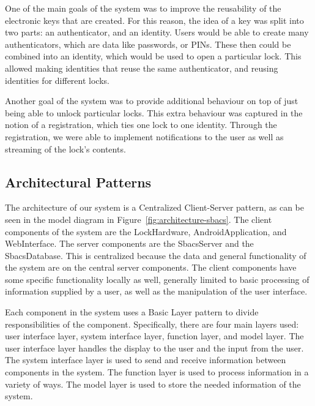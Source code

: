 \documentclass[12pt]{report}
\let\Oldsubsection\subsection
\renewcommand{\subsection}{\FloatBarrier\Oldsubsection}
\begin{document}
One of the main goals of the system was to improve the reusability of the electronic keys that are created. For this
reason, the idea of a key was split into two parts: an authenticator, and an identity. Users would be able to create
many authenticators, which are data like passwords, or PINs. These then could be combined into an identity, which
would be used to open a particular lock. This allowed making identities that reuse the same authenticator, and reusing
identities for different locks.

Another goal of the system was to provide additional behaviour on top of just being able to unlock particular locks.
This extra behaviour was captured in the notion of a registration, which ties one lock to one identity. Through the
registration, we were able to implement notifications to the user as well as streaming of the lock's contents.


\subsection{Architectural Patterns} \label{architectural-patterns}


The architecture of our system is a Centralized Client-Server pattern, as can be seen in the model diagram 
in Figure~\ref{fig:architecture-sbacs}. The client components of
the system are the LockHardware, AndroidApplication, and WebInterface. The server components are the SbacsServer and
the SbacsDatabase. This is centralized because the data and general functionality of the system are on the central
server components. The client components have some specific functionality locally as well, generally limited to
basic processing of information supplied by a user, as well as the manipulation of the user interface.

Each component in the system uses a Basic Layer pattern to divide responsibilities of the component. Specifically,
there are four main layers used: user interface layer, system interface layer, function layer, and model layer.
The user interface layer handles the display to the user and the input from the user. The system interface layer
is used to send and receive information between components in the system. The function layer is used to process
information in a variety of ways. The model layer is used to store the needed information of the system.
\end{document}

